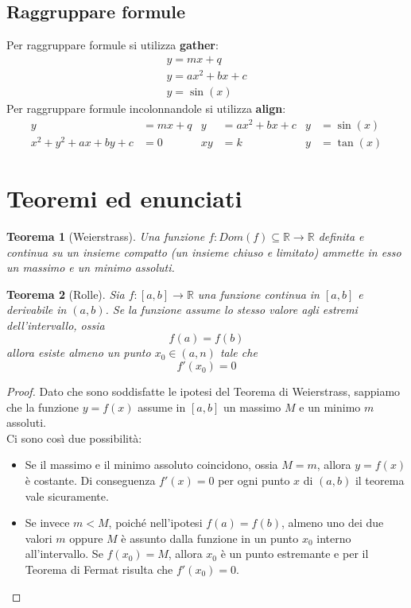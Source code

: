 \documentclass[a4paper,12pt,oneside]{book}
\theoremstyle{plain}
\newtheorem{teorema}{Teorema}[section]
\begin{document}
	
	\subsection{Raggruppare formule}
	Per raggruppare formule si utilizza \textbf{gather}:
	\begin{gather}
		y = mx + q\\
		y = ax^2 + bx + c\\
		y = \sin(x)
	\end{gather}
	Per raggruppare formule incolonnandole si utilizza \textbf{align}:
	\begin{align}
		y &= mx + q	& y &= ax^2 + bx + c & y &= \sin(x)\\
		x^2 + y^2 + ax + by + c &= 0 & xy &= k & y &= \tan(x)
	\end{align}
	
	
	\section{Teoremi ed enunciati}
	\begin{teorema}[Weierstrass]
		Una funzione $f:Dom(f)\subseteq \mathbb{R}\rightarrow\mathbb{R}$ definita e continua su un insieme compatto (un insieme chiuso e limitato) ammette in esso un massimo e un minimo assoluti.
	\end{teorema}
	\begin{teorema}[Rolle]
		Sia $f:[a,b]\rightarrow\mathbb{R}$ una funzione continua in $[a,b]$ e derivabile in $(a,b)$. Se la funzione assume lo stesso valore agli estremi dell'intervallo, ossia
		\[
		f(a) = f(b)
		\]
		allora esiste almeno un punto $x_0\in(a,n)$ tale che
		\[
		f'(x_0) = 0
		\]
	\end{teorema}
	\begin{proof}
		Dato che sono soddisfatte le ipotesi del Teorema di Weierstrass, sappiamo che la funzione $y = f(x)$ assume in $[a,b]$ un massimo $M$ e un minimo $m$ assoluti.\\
		Ci sono così due possibilità:
		\begin{itemize}
			\item Se il massimo e il minimo assoluto coincidono, ossia $M = m$, allora $y = f(x)$ è costante. Di conseguenza $f'(x) = 0$ per ogni punto $x$ di $(a,b)$ il teorema vale sicuramente.
			
			\item Se invece $m < M$, poiché nell'ipotesi $f(a) = f(b)$, almeno uno dei due valori $m$ oppure $M$ è assunto dalla funzione in un punto $x_0$ interno all'intervallo. Se $f(x_0) = M$, allora $x_0$ è un punto estremante e per il Teorema di Fermat risulta che $f'(x_0) = 0$.
		\end{itemize}
	\end{proof}
\end{document}
